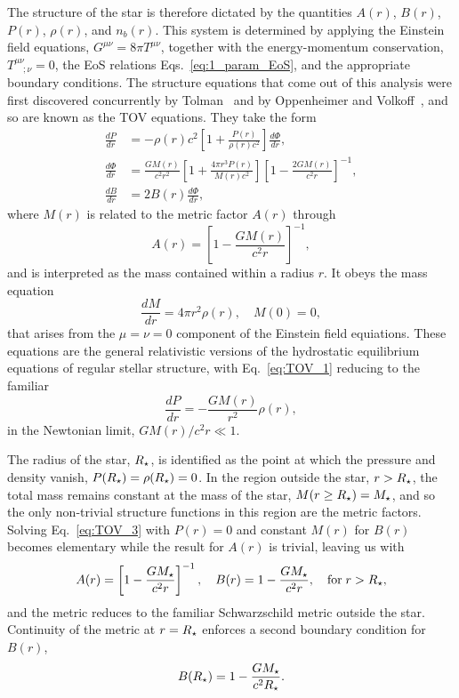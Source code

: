 The structure of the star is therefore dictated by the quantities $A(r)$, $B(r)$, $P(r)$, $\rho(r)$, and $n_b(r)$. This system is determined by applying the Einstein field equations, $G^{\mu\nu} = 8\pi T^{\mu\nu}$, together with the energy-momentum conservation, $T^{\mu\nu}_{\quad;\nu}=0$, the EoS relations Eqs.~\ref{eq:1_param_EoS}, and the appropriate boundary conditions. The structure equations that come out of this analysis were first discovered concurrently by Tolman~\cite{Tolman:1939jz_StaticSolutionsEinstein} and by Oppenheimer and Volkoff~\cite{Oppenheimer:1939ne_MassiveNeutronCores}, and so are known as the TOV equations. They take the form
\begin{align}
    \frac{dP}{dr} &= -\rho(r) c^2  \left[ 1 + \frac{P(r)}{\rho(r) c^2} \right]\frac{d\Phi}{dr},\label{eq:TOV_1}\\
    \frac{d\Phi}{dr} & = \frac{G M(r)}{c^2 r^2} \left[ 1 + \frac{4\pi r^3 P(r)}{M(r)c^2} \right] \left[ 1 - \frac{2 G M(r)}{c^2 r}\right]^{-1}\label{eq:TOV_2},\\
    \frac{dB}{dr} & = 2B(r) \frac{d\Phi}{dr},\label{eq:TOV_3}
\end{align}
where $M(r)$ is related to the metric factor $A(r)$ through
\begin{equation}
    A(r) = \left[ 1 - \frac{G M(r)}{c^2 r} \right]^{-1},
\end{equation}
and is interpreted as the mass contained within a radius $r$. It obeys the mass equation 
\begin{equation}
    \frac{dM}{dr} = 4\pi r^2 \rho(r),\quad M(0) = 0,
    \label{eq:mass_equation_TOV}
\end{equation}
that arises from the $\mu = \nu = 0$ component of the Einstein field equiations. 
These equations are the general relativistic versions of the hydrostatic equilibrium equations of regular stellar structure, with Eq.~\ref{eq:TOV_1} reducing to the familiar 
\begin{equation}
    \frac{dP}{dr} = -\frac{GM(r)}{r^2}\rho(r),
\end{equation}
in the Newtonian limit, $GM(r)/c^2 r \ll 1$.

The radius of the star, $R_\star$, is identified as the point at which the pressure and density vanish, $P(R_\star) = \rho(R_\star) = 0$. In the region outside the star, $r>R_\star$, the total mass remains constant at the mass of the star, $M(r \geq  R_\star) = M_\star$, and so the only non-trivial structure functions in this region are the metric factors. Solving Eq.~\ref{eq:TOV_3} with $P(r)=0$ and constant $M(r)$ for $B(r)$ becomes elementary while the result for $A(r)$ is trivial, leaving us with
\begin{equation}
    A(r) = \left[ 1 - \frac{G M_\star}{c^2 r} \right]^{-1}, \quad B(r) = 1 - \frac{G M_\star}{c^2 r} ,\quad\mathrm{for}\;r > R_\star,
\end{equation}
and the metric reduces to the familiar Schwarzschild metric outside the star. 
Continuity of the metric at $r= R_\star$ enforces a second boundary condition for $B(r)$,
\begin{equation}
    B(R_\star) = 1 - \frac{G M_\star}{c^2 R_\star}.
    \label{eq:B_boundary_condition}
\end{equation}

